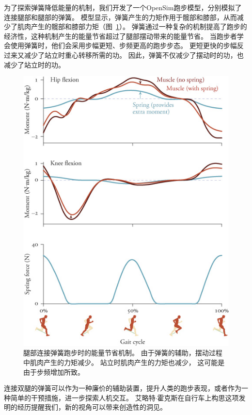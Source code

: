 为了探索弹簧降低能量的机制，我们开发了一个OpenSim跑步模型，分别模拟了连接腿部和腿部的弹簧。
模型显示，弹簧产生的力矩作用于髋部和膝部，从而减少了肌肉产生的髋部和膝部力矩（图~\ref{fig:12_16}）。
弹簧通过一种复杂的机制提高了跑步的经济性，这种机制产生的能量节省超过了腿部摆动带来的能量节省。
当跑步者学会使用弹簧时，他们会采用步幅更短、步频更高的跑步步态。
更短更快的步幅反过来又减少了站立时重心转移所需的功。
因此，弹簧不仅减少了摆动时的功，也减少了站立时的功。


\begin{figure}[!htb]
	\centering
	\includegraphics[width=1.0\linewidth]{chap12/12_16}
	\caption{腿部连接弹簧跑步时的能量节省机制。
		由于弹簧的辅助，摆动过程中肌肉产生的力矩减少。
		站立时肌肉产生的力矩也减少，
		这可能是由于步频增加所致\cite{simpson2019connecting}。 \label{fig:12_16}}
\end{figure}


连接双腿的弹簧可以作为一种廉价的辅助装置，提升人类的跑步表现，或者作为一种简单的干预措施，进一步探索人机交互。
艾略特$\cdot$霍克斯在自行车上构思这项发明的经历提醒我们，新的视角可以带来创造性的洞见。







